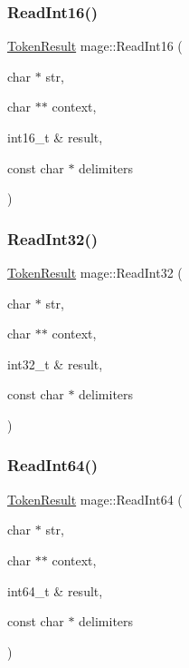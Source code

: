 \hypertarget{namespacemage_ae5362fb3f4d97bcecd70e5baeb22834f}{}\label{namespacemage_ae5362fb3f4d97bcecd70e5baeb22834f} 
\subsubsection{\texorpdfstring{Read\+Int16()}{ReadInt16()}}
{\footnotesize\ttfamily \hyperlink{namespacemage_a2178ba2411db5912f41b2e7698c2037d}{Token\+Result} mage\+::\+Read\+Int16 (\begin{DoxyParamCaption}\item[{char $\ast$}]{str,  }\item[{char $\ast$$\ast$}]{context,  }\item[{int16\+\_\+t \&}]{result,  }\item[{const char $\ast$}]{delimiters }\end{DoxyParamCaption})}

\hypertarget{namespacemage_a159df5ff8941b52ea523d0ebb4c2fd24}{}\label{namespacemage_a159df5ff8941b52ea523d0ebb4c2fd24} 
\subsubsection{\texorpdfstring{Read\+Int32()}{ReadInt32()}}
{\footnotesize\ttfamily \hyperlink{namespacemage_a2178ba2411db5912f41b2e7698c2037d}{Token\+Result} mage\+::\+Read\+Int32 (\begin{DoxyParamCaption}\item[{char $\ast$}]{str,  }\item[{char $\ast$$\ast$}]{context,  }\item[{int32\+\_\+t \&}]{result,  }\item[{const char $\ast$}]{delimiters }\end{DoxyParamCaption})}

\hypertarget{namespacemage_aba0fbc26edf53c3ad92f954adca8e86d}{}\label{namespacemage_aba0fbc26edf53c3ad92f954adca8e86d} 
\subsubsection{\texorpdfstring{Read\+Int64()}{ReadInt64()}}
{\footnotesize\ttfamily \hyperlink{namespacemage_a2178ba2411db5912f41b2e7698c2037d}{Token\+Result} mage\+::\+Read\+Int64 (\begin{DoxyParamCaption}\item[{char $\ast$}]{str,  }\item[{char $\ast$$\ast$}]{context,  }\item[{int64\+\_\+t \&}]{result,  }\item[{const char $\ast$}]{delimiters }\end{DoxyParamCaption})}

